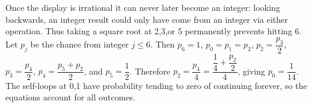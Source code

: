 Once the display is irrational it can never later become an integer: looking backwards, an integer result could only have come from an integer via either operation. Thus taking a square root at 2,3,or 5 permanently prevents hitting 6. Let $p_j$ be the chance from integer $j\le6$. Then $p_6=1$, $p_0=p_1=p_2$, $p_2=\dfrac{p_3}{2}$, $p_3=\dfrac{p_4}{2}$, $p_4=\dfrac{p_5+p_2}{2}$, and $p_5=\dfrac{1}{2}$. Therefore $p_2=\dfrac{p_4}{4}=\dfrac{\dfrac{1}{4}+\dfrac{p_2}{2}}{4}$, giving $\boxed{p_0=\dfrac{1}{14}}$. The self-loops at 0,1 have probability tending to zero of continuing forever, so the equations account for all outcomes.
